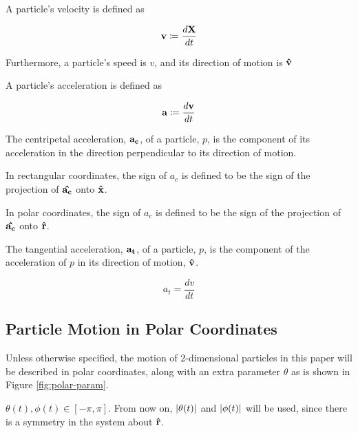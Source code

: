 \begin{definition}
  A particle's velocity is defined as 

  \[\mathbf{v} \coloneqq \frac{d\mathbf{X}}{dt}\]

  Furthermore, a particle's speed is $v$, and its direction of motion is $\mathbf{\hat{v}}$

\end{definition}

\begin{definition}
  A particle's acceleration is defined as 
  
  \[\mathbf{a} \coloneqq \frac{d\mathbf{v}}{dt}\]
\end{definition}

\begin{definition}
  The centripetal acceleration, $\mathbf{a_c}$, of a particle, $p$, is the component of its acceleration in the direction perpendicular to its direction of motion.

  In rectangular coordinates, the sign of $a_c$ is defined to be the sign of the projection of $\mathbf{\hat{a_c}}$ onto $\mathbf{\hat{x}}$. 

  In polar coordinates, the sign of $a_c$ is defined to be the sign of the projection of $\mathbf{\hat{a_c}}$ onto $\mathbf{\hat{r}}$.
\end{definition}

\begin{definition}
  The tangential acceleration, $\mathbf{a_t}$, of a particle, $p$, is the component of the acceleration of $p$ in its direction of motion, $\mathbf{\hat{v}}$.

  \[
  a_t = \frac{dv}{dt}
  \]
\end{definition}


\subsection{Particle Motion in Polar Coordinates}

Unless otherwise specified, the motion of 2-dimensional particles in this paper will be described in polar coordinates, along with an extra parameter $\theta$ as is shown in Figure \ref{fig:polar-param}.


$\theta(t), \phi(t) \in [-\pi, \pi]$. From now on, $\abs{\theta(t)}$ and $\abs{\phi(t)}$ will be used, since there is a symmetry in the system about $\mathbf{\hat{r}}$.


